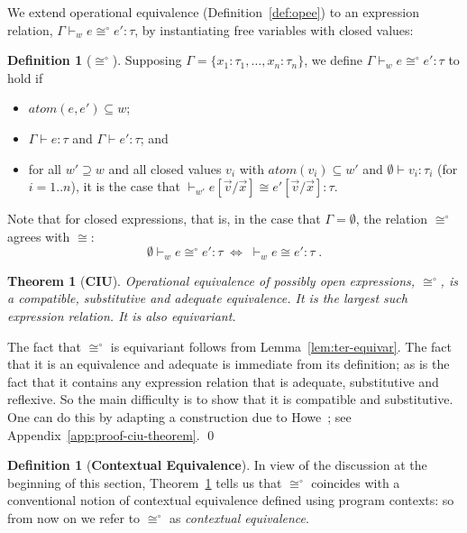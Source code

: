 \documentclass{LMCS}
\theoremstyle{plain}
\newtheorem{theorem}[thm]{Theorem}
\theoremstyle{definition}
\newtheorem{definition}[thm]{Definition}
\newcommand{\atoms}{\mathit{atom}}
\newcommand{\bimp}{\Leftrightarrow}
\newcommand{\ent}{\vdash}
\newcommand{\enty}{\vdash}
\renewcommand{\exp}[1][e]{#1}
\newcommand{\ofty}{:}
\newcommand{\opeq}{\cong}
\newcommand{\opeqo}{\cong^{\circ}}
\newcommand{\sub}[2]{{[#2/#1]}}
\newcommand{\ty}{\tau}
\newcommand{\val}[1][v]{#1}
\newcommand{\vid}[1][x]{#1}
\newcommand{\w}[1][w]{#1}
\begin{document}
We extend operational equivalence (Definition~\ref{def:opee}) to an
expression relation, $\Gamma\ent_{\w}\exp\opeqo\exp'\ofty\ty$, by
instantiating free variables with closed values:
\begin{definition}[$\opeqo$]
  \label{def:opeqo}
  Supposing $\Gamma=\{\vid_1\ofty\ty_1,\ldots,\vid_n\ofty\ty_n\}$, we
  define $\Gamma\ent_{\w}\exp\opeqo\exp'\ofty\ty$ to hold if
  \begin{itemize}

  \item $\atoms(e,e')\subseteq\w$;
    
  \item $\Gamma\enty\exp\ofty\ty$ and
    $\Gamma\enty\exp'\ofty\ty$; and
    
  \item for all $\w'\supseteq\w$ and all closed values $\val_i$ with
    $\atoms(\val_i)\subseteq\w'$ and $\emptyset\enty\val_i\ofty\ty_i$
    (for $i=1..n$), it is the case that $\ent_{\w'}
    \exp\sub{\vec{\vid}}{\vec{\val}} \opeq
    \exp'\sub{\vec{\vid}}{\vec{\val}} \ofty \ty$.
    
  \end{itemize}
  Note that for closed expressions, that is, in the case that
  $\Gamma=\emptyset$, the relation $\opeqo$ agrees with $\opeq$:
  \begin{equation}
    \label{eq:70}
    \emptyset\ent_{\w} \exp\opeqo\exp'\ofty\ty \;\bimp\;
  {}\ent_{\w}\exp\opeq\exp'\ofty\ty\;.
  \end{equation}
\end{definition}

\begin{theorem}[\textbf{CIU}]
  \label{thm:ciu}
  Operational equivalence of possibly open expressions, $\opeqo$, is a
  compatible, substitutive and adequate equivalence. It is the largest
  such expression relation. It is also equivariant.
\end{theorem}
\proof
  The fact that $\opeqo$ is equivariant follows from
  Lemma~\ref{lem:ter-equivar}. The fact that it is an equivalence and
  adequate is immediate from its definition; as is the fact that it
  contains any expression relation that is adequate, substitutive
  and reflexive. So the main difficulty is to show that it is
  compatible and substitutive. One can do this by adapting a
  construction due to Howe~\cite{HoweDJ:procbf}; see
  Appendix~\ref{app:proof-ciu-theorem}.
\qed

\begin{definition}[\textbf{Contextual Equivalence}]
  \label{def:cone}
  In view of the discussion at the beginning of this section,
  Theorem~\ref{thm:ciu} tells us that $\opeqo$ coincides with a
  conventional notion of contextual equivalence defined using program
  contexts: so from now on we refer to $\opeqo$ as \emph{contextual
    equivalence}.
\end{definition}
\end{document}
